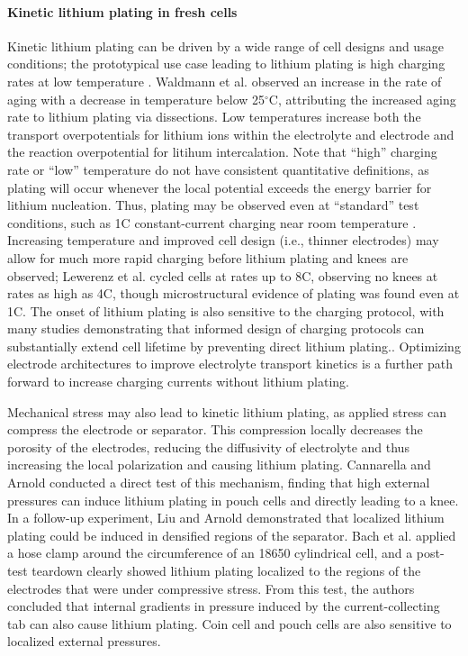 \documentclass[journal=jpcl, manuscript=article, layout=onecolumn]{achemso}
\begin{document}
\paragraph{Kinetic lithium plating in fresh cells}
Kinetic lithium plating can be driven by a wide range of cell designs and usage conditions; the prototypical use case leading to lithium plating is high charging rates at low temperature \cite{waldmann_temperature_2014, petzl_lithium_2015}. Waldmann et al.\cite{waldmann_temperature_2014} observed an increase in the rate of aging with a decrease in temperature below 25$^{\circ}$C, attributing the increased aging rate to lithium plating via dissections. Low temperatures increase both the transport overpotentials for lithium ions within the electrolyte and electrode and the reaction overpotential for litihum intercalation. Note that ``high'' charging rate or ``low'' temperature do not have consistent quantitative definitions, as plating will occur whenever the local potential exceeds the energy barrier for lithium nucleation. Thus, plating may be observed even at ``standard'' test conditions, such as 1C constant-current charging near room temperature \cite{waldmann_optimization_2015,burns_-situ_2015}. Increasing temperature and improved cell design (i.e., thinner electrodes) may allow for much more rapid charging before lithium plating and knees are observed; Lewerenz et al.\cite{lewerenz_systematic_2017} cycled cells at rates up to 8C, observing no knees at rates as high as 4C, though microstructural evidence of plating was found even at 1C. The onset of lithium plating is also sensitive to the charging protocol, with many studies demonstrating that informed design of charging protocols can substantially extend cell lifetime by preventing direct lithium plating.\cite{waldmann_optimization_2015,schindler_fast_2018}. Optimizing electrode architectures to improve electrolyte transport kinetics is a further path forward to increase charging currents without lithium plating.\cite{nemani_design_2015, usseglio-viretta_enabling_2020}

Mechanical stress may also lead to kinetic lithium plating, as applied stress can compress the electrode or separator. This compression locally decreases the porosity of the electrodes, reducing the diffusivity of electrolyte and thus increasing the local polarization and causing lithium plating. Cannarella and Arnold\cite{cannarella_stress_2014} conducted a direct test of this mechanism, finding that high external pressures can induce lithium plating in pouch cells and directly leading to a knee. In a follow-up experiment, Liu and Arnold\cite{liu_effects_2020} demonstrated that localized lithium plating could be induced in densified regions of the separator. Bach et al.\cite{bach_nonlinear_2016} applied a hose clamp around the circumference of an 18650 cylindrical cell, and a post-test teardown clearly showed lithium plating localized to the regions of the electrodes that were under compressive stress. From this test, the authors concluded that internal gradients in pressure induced by the current-collecting tab can also cause lithium plating. Coin cell and pouch cells are also sensitive to localized external pressures.\cite{liu_size_2018, fuchs_post-mortem_2019, okasinski_situ_2020}
\end{document}

